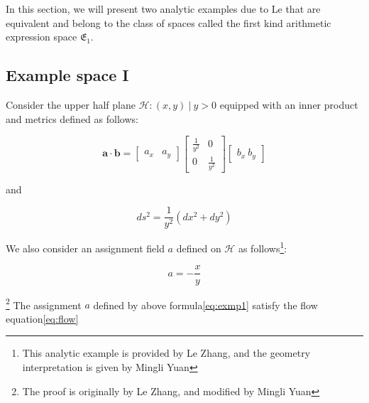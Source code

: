 
In this section, we will present two analytic examples due to Le that are equivalent and belong to the class of spaces
called the first kind arithmetic expression space $\mathfrak{E}_1$.

\subsection{Example space I}\label{subsec:exmp1}

Consider the upper half plane ${\mathcal{H}: (x, y) \ | \ y > 0}$ equipped with an inner product and metrics defined as follows:

$$
\mathbf{a} \cdot \mathbf{b} = \begin{bmatrix} a_x & a_y \end{bmatrix} \begin{bmatrix} \frac{1}{y^2} & 0 \\ 0 & \frac{1}{y^2} \end{bmatrix} \begin{bmatrix} b_x \ b_y \end{bmatrix}
$$

and

$$
ds^2 = \frac{1}{y^2} (dx^2 + dy^2)
$$

We also consider an assignment field $a$ defined on $\mathcal{H}$ as follows\footnote{This analytic example is provided by Le Zhang, and the geometry interpretation is given by Mingli Yuan}:

\begin{equation}\label{eq:exmp1}
a = - \frac{x}{y}
\end{equation}

\begin{theorem}\footnote{The proof is originally by Le Zhang, and modified by Mingli Yuan}
The assignment $a$ defined by above formula\eqref{eq:exmp1} satisfy the flow equation\eqref{eq:flow}
\end{theorem}

